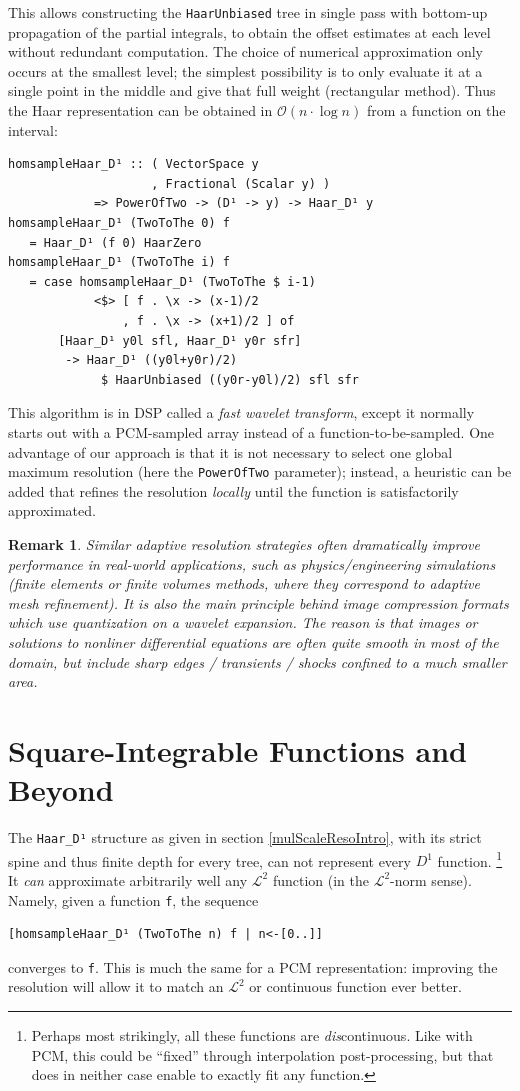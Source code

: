 \documentclass[sigplan,screen]{acmart}
\theoremstyle{acmplain}
\theoremstyle{acmdefinition}
\newtheorem{remark}[theorem]{Remark}
\begin{document}
This allows constructing the \lstinline`HaarUnbiased` tree in single pass with bottom-up propagation of the partial integrals, to obtain the offset estimates at each level without redundant computation.
The choice of numerical approximation only occurs at the smallest level;
the simplest possibility is to only evaluate it at a single point in the middle and give that full weight (rectangular method).
Thus the Haar representation can be obtained in $\mathcal{O}(n\cdot\log n)$ from a function on the interval:
\begin{lstlisting}
homsampleHaar_D¹ :: ( VectorSpace y
                    , Fractional (Scalar y) )
            => PowerOfTwo -> (D¹ -> y) -> Haar_D¹ y
homsampleHaar_D¹ (TwoToThe 0) f
   = Haar_D¹ (f 0) HaarZero
homsampleHaar_D¹ (TwoToThe i) f
   = case homsampleHaar_D¹ (TwoToThe $ i-1)
            <$> [ f . \x -> (x-1)/2
                , f . \x -> (x+1)/2 ] of
       [Haar_D¹ y0l sfl, Haar_D¹ y0r sfr]
        -> Haar_D¹ ((y0l+y0r)/2)
             $ HaarUnbiased ((y0r-y0l)/2) sfl sfr
\end{lstlisting}
This algorithm is in DSP called a \emph{fast wavelet transform}, except it normally starts out with a PCM-sampled array instead of a function-to-be-sampled.
One advantage of our approach is that it is not necessary to select one global maximum resolution (here the \lstinline`PowerOfTwo` parameter); instead, a heuristic can be added that refines the resolution \emph{locally} until the function is satisfactorily approximated.
\begin{remark}
Similar adaptive resolution strategies often dramatically improve performance in real-world applications, such as physics/engineering simulations (finite elements or finite volumes methods, where they correspond to adaptive mesh refinement).
It is also the main principle behind image compression formats which use quantization on a wavelet expansion.
The reason is that images or solutions to nonliner differential equations are often quite smooth in most of the domain, but include sharp edges / transients / shocks confined to a much smaller area.
\end{remark}

\section{Square-Integrable Functions and Beyond}
The \verb`Haar_D¹` structure as given in section \ref{mulScaleResoIntro}, with its strict spine and thus finite depth for every tree, can not represent every $D^1$ function. \footnote{Perhaps most strikingly, all these functions are \emph{dis}continuous. Like with PCM, this could be “fixed” through interpolation post-processing, but that does in neither case enable to exactly fit any function.}
It \emph{can} approximate arbitrarily well any $\mathcal{L}^2$ function (in the $\mathcal{L}^2$-norm sense). Namely, given a function \verb`f`, the sequence
\begin{lstlisting}
[homsampleHaar_D¹ (TwoToThe n) f | n<-[0..]]
\end{lstlisting}
converges to \verb`f`. This is much the same for a PCM representation: improving the resolution will allow it to match an $\mathcal{L}^2$ or continuous function ever better.
\end{document}
